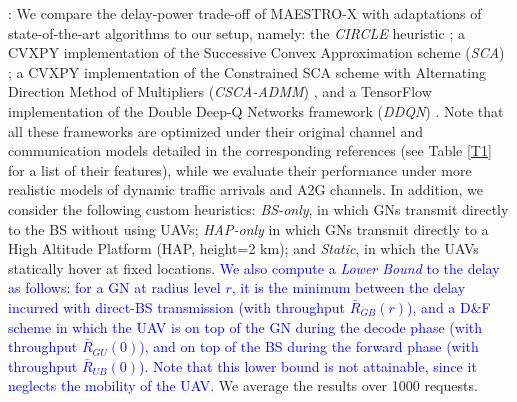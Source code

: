 \documentclass[12pt, draftcls, onecolumn]{IEEEtran}
\theoremstyle{plain}
\theoremstyle{definition}
\theoremstyle{remark}
\newcommand\hlt[1]{\textcolor{blue}{#1}}
\begin{document}
: We compare the delay-power trade-off of MAESTRO-X with adaptations of state-of-the-art algorithms to our setup, namely: the \emph{CIRCLE} heuristic \cite{MEC-DDPG}; a CVXPY implementation of the Successive Convex Approximation scheme (\emph{SCA}) \cite{SCA}; a CVXPY implementation of the Constrained SCA scheme with Alternating Direction Method of Multipliers (\emph{CSCA-ADMM}) \cite{CSCA-ADMM}, and a TensorFlow implementation of the Double Deep-Q Networks framework (\emph{DDQN}) \cite{DDQN}. Note that all these frameworks are optimized under their original channel and communication models detailed in the corresponding references (see Table \ref{T1} for a list of their features), while we evaluate their performance under more realistic models of dynamic traffic arrivals and A2G channels. In addition, we consider the following custom heuristics: \emph{BS-only}, in which GNs transmit directly to the BS without using UAVs; \emph{HAP-only} in which GNs transmit directly to a High Altitude Platform (HAP, height=2 km); and \emph{Static}, in which the UAVs statically hover at fixed locations.
\label{LB}
\hlt{We also compute a \emph{Lower Bound} to the delay as follows:
for a GN at radius level $r$,
it is the minimum between the delay incurred with direct-BS transmission (with throughput $\bar{R}_{GB}(r)$), and a D\&F scheme in which the UAV is on top of the GN during the decode phase (with throughput $\bar{R}_{GU}(0)$), and
on top of the BS during the forward phase (with throughput $\bar{R}_{UB}(0)$). Note that this lower bound is not attainable, since it neglects the mobility of the UAV.}
We average the results over 1000 requests.
\end{document}

